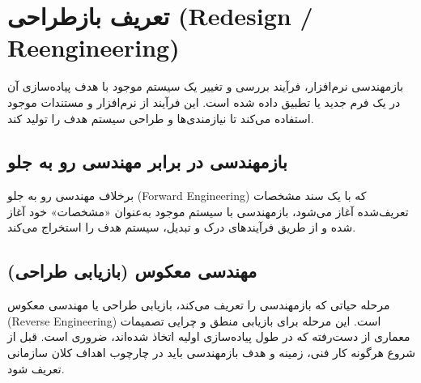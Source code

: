 \section{تعریف بازطراحی (Redesign / Reengineering)}
\label{sec:ch4-definition}

بازمهندسی نرم‌افزار، فرآیند بررسی و تغییر یک سیستم موجود با هدف پیاده‌سازی آن در یک فرم جدید یا تطبیق داده شده است. این فرآیند از نرم‌افزار و مستندات موجود استفاده می‌کند تا نیازمندی‌ها و طراحی سیستم هدف را تولید کند.

\subsection{بازمهندسی در برابر مهندسی رو به جلو}
برخلاف مهندسی رو به جلو (Forward Engineering) که با یک سند مشخصات تعریف‌شده آغاز می‌شود، بازمهندسی با سیستم موجود به‌عنوان «مشخصات» خود آغاز شده و از طریق فرآیندهای درک و تبدیل، سیستم هدف را استخراج می‌کند.

\subsection{مهندسی معکوس (بازیابی طراحی)}
مرحله حیاتی که بازمهندسی را تعریف می‌کند، بازیابی طراحی یا مهندسی معکوس (Reverse Engineering) است. این مرحله برای بازیابی منطق و چرایی تصمیمات معماری از دست‌رفته که در طول پیاده‌سازی اولیه اتخاذ شده‌اند، ضروری است. قبل از شروع هرگونه کار فنی، زمینه و هدف بازمهندسی باید در چارچوب اهداف کلان سازمانی تعریف شود.
